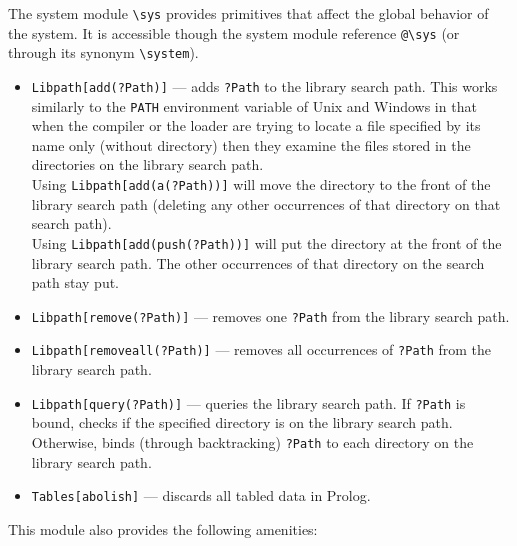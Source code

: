 \documentclass[11pt]{article}
\newcommand{\bs}{\textbackslash}
\begin{document}
The system module {\tt \bs{}sys} provides primitives that affect the global
behavior of the system. It is accessible though the system module reference
{\tt @\bs{}sys} (or through its synonym {\tt \bs{}system}). 
\begin{itemize}
  \item  {\tt Libpath[add(?Path)]} --- adds {\tt ?Path} to the library
    search path. This works similarly to the {\tt PATH} environment
    variable of Unix and Windows
    in that when the compiler or the loader are trying to locate a
    file specified by its name only (without directory) then they
    examine the files stored in the directories on the library search path.
    \\
    Using \texttt{Libpath[add(a(?Path))]}  will move the directory to the
    front of the library search path (deleting any other occurrences of that
    directory on that search path).\\
    Using \texttt{Libpath[add(push(?Path))]}  will put the directory at the
    front of the library search path. The other occurrences of that
    directory on the search path stay put.
  \item {\tt Libpath[remove(?Path)]} --- removes one {\tt ?Path} from the
    library search path.
  \item {\tt Libpath[removeall(?Path)]} --- removes all occurrences of
    {\tt ?Path} from the library search path.
  \item {\tt Libpath[query(?Path)]} --- queries the library search path. If
    {\tt ?Path} is bound, checks if the specified directory is on the
    library search path. Otherwise, binds (through backtracking) {\tt ?Path}
    to each directory on the library search path.
  \item {\tt Tables[abolish]} --- discards all tabled data in Prolog.
\end{itemize}
This module also provides the following amenities:
\end{document}
